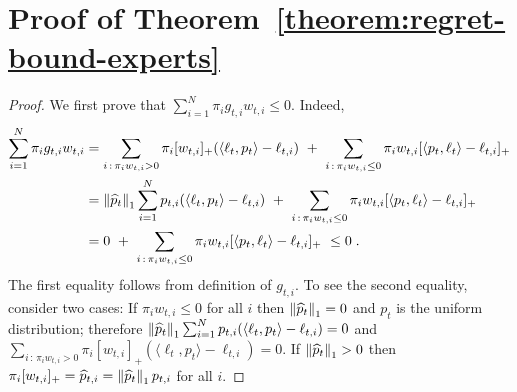\section{Proof of Theorem~\ref{theorem:regret-bound-experts}}
\label{sec:appendix-erpert-reduction}

\begin{proof}
We first prove that $\sum_{i=1}^N \pi_i g_{t,i} w_{t,i} \le 0$. Indeed,
\begin{align*}
\sum_{i=1}^N \pi_i g_{t,i} w_{t,i}
& = \sum_{i \, : \, \pi_i w_{t,i} > 0} \pi_i [w_{t,i}]_+ (\langle \ell_t, p_t \rangle - \ell_{t,i})  \ + \ \sum_{i \, : \, \pi_i w_{t,i} \le 0} \pi_i w_{t,i} [\langle p_t, \ell_t\rangle - \ell_{t,i}]_+ \\
& = \left\|{\widehat p_t}\right\|_1 \sum_{i=1}^N p_{t,i} (\langle \ell_t, p_t \rangle - \ell_{t,i})  \ + \ \sum_{i \, : \, \pi_i w_{t,i} \le 0} \pi_i w_{t,i} [\langle p_t, \ell_t\rangle - \ell_{t,i}]_+ \\
& = 0 \ + \ \sum_{i \, : \, \pi_i w_{t,i} \le 0} \pi_i w_{t,i} [\langle p_t, \ell_t\rangle - \ell_{t,i}]_+
\ \le 0 \; .
\end{align*}
The first equality follows from definition of $g_{t,i}$. To see the second equality,
consider two cases: If $\pi_i w_{t,i} \le 0$ for all $i$ then $\left\|{\widehat p_t}\right\|_1 = 0$ and $p_t$ is the uniform distribution;
therefore $\left\|{\widehat p_t}\right\|_1 \sum_{i=1}^N p_{t,i} (\langle \ell_t, p_t \rangle - \ell_{t,i}) = 0$ and
$\sum_{i \, : \, \pi_i w_{t,i} > 0} \pi_i [w_{t,i}]_+ (\langle \ell_t, p_t \rangle - \ell_{t,i}) = 0$.
If $\left\|{\widehat p_t}\right\|_1 > 0$ then $\pi_i [w_{t,i}]_+ = \widehat p_{t,i} = \left\|{\widehat p_t}\right\|_1 p_{t,i}$ for all $i$.


\end{proof}
